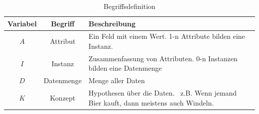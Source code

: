 \begin{table}[H] 
	\caption{Begriffsdefinition}
	\centering
	
	\begin{tabular}{ | c | c | p{8cm} |} 
		\hline 
		\rowcolor{tableheadcolor}
		\bfseries Variabel & 
		\bfseries Begriff & 
		\bfseries Beschreibung \\ \hline 
		$A$ & Attribut & Ein Feld mit einem Wert. 1-n Attribute bilden eine Instanz. \\ \hline 
		$I$ & Instanz & Zusammenfassung von Attributen. 0-n Instanzen bilden eine Datenmenge \\ \hline 
		$D$ & Datenmenge & Menge aller Daten \\ \hline 
		$K$ & Konzept & Hypothesen über die Daten. \ z.B. Wenn jemand Bier kauft, dann meistens auch Windeln. \\ \hline 
	\end{tabular} 
\end{table}
